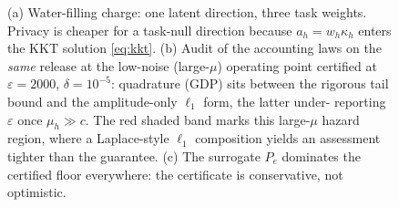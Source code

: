 \begin{figure}[t]
\caption{(a) Water-filling charge: one latent direction, three task weights.
Privacy is cheaper for a task-null direction because $a_h=w_h\kappa_h$
enters the KKT solution \eqref{eq:kkt}. (b) Audit of the accounting laws on
the \emph{same} release at the low-noise (large-$\mu$) operating point certified at
$\varepsilon{=}2000$, $\delta{=}10^{-5}$: quadrature (GDP) sits between the
rigorous tail bound and the amplitude-only $\ell_1$ form, the latter under-
reporting $\varepsilon$ once $\mu_h\gg c$. The red shaded band marks this
large-$\mu$ hazard region, where a Laplace-style $\ell_1$ composition yields an
assessment tighter than the guarantee. (c) The surrogate $P_e$ dominates the
certified floor everywhere: the certificate is conservative, not optimistic.}
\label{fig:composite}
\end{figure}

